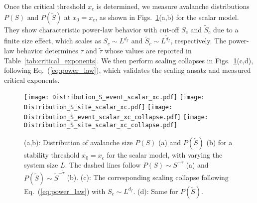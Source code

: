 \documentclass[pre,twocolumn,superscriptaddress,tightenlines,showpacs,longbibliography,floatfix,footinbib]{revtex4-1}
\begin{document}






Once the critical threshold $x_c$ is determined, we measure avalanche distributions $P(S)$ and $P(\tilde S)$ at $x_0=x_c$, as shown in Figs.~\ref{fig:scalar_zero_T}(a,b) for the scalar model. They show characteristic power-law behavior with cut-off $S_c$ and $\tilde S_c$ due to a finite size effect, which scales as $S_c \sim L^{d_f}$ and $\tilde S_c \sim L^{\tilde d_f}$, respectively.
The power-law behavior determines $\tau$ and  $\tilde \tau$ whose values are reported in Table~\ref{tab:critical_exponents}.
We then perform scaling collapses in Figs.~\ref{fig:scalar_zero_T}(c,d), following Eq.~(\ref{eq:power_law}), which validates the scaling ansatz and measured critical exponents.




\begin{figure}
\centering
\texttt{[image: Distribution\_S\_event\_scalar\_xc.pdf]}
\texttt{[image: Distribution\_S\_site\_scalar\_xc.pdf]}
\texttt{[image: Distribution\_S\_event\_scalar\_xc\_collapse.pdf]}
\texttt{[image: Distribution\_S\_site\_scalar\_xc\_collapse.pdf]}
\caption{(a,b): Distribution of avalanche size $P(S)$ (a) and $P(\tilde S)$ (b) for a stability threshold $x_0=x_c$ for the scalar model, with varying the system size $L$. The dashed lines follow $P(S) \sim S^{-\tau}$ (a) and $P(\tilde S) \sim \tilde  S^{-\tilde  \tau}$ (b). (c): The corresponding scaling collapse following Eq.~(\ref{eq:power_law}) with $S_c \sim L^{d_f}$. (d): Same for $P(\tilde S)$.
}
\label{fig:scalar_zero_T}
\end{figure}
\end{document}
